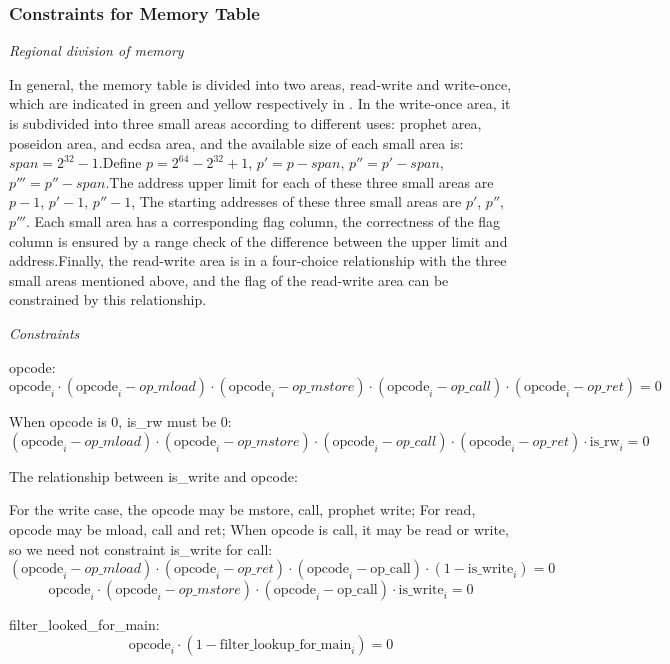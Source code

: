 \subsubsection{Constraints for Memory Table} \label{sec:memory-constraints}

\noindent \emph{Regional division of memory}

In general, the memory table is divided into two areas, read-write and write-once, which are indicated in green and yellow respectively in .
In the write-once area, it is subdivided into three small areas according to different uses: prophet area, poseidon area, and ecdsa area, and the available size of each small area is:
$span = 2^{32} - 1$.Define $p =2^{64} - 2^{32} + 1$, $p'=p-span$, $p''=p'-span$, $p'''=p''-span$.The address upper limit for each of these three small areas are $p-1$, $p'-1$, $p''-1$,
The starting addresses of these three small areas are $p'$, $p''$, $p'''$.
Each small area has a corresponding flag column, the correctness of the flag column is ensured by a
range check of the difference between the upper limit and address.Finally, the read-write area is in a four-choice relationship with the three small areas mentioned above, and the
flag of the read-write area can be constrained by this relationship.

\noindent \emph{Constraints}

opcode:
\[\mathrm{opcode}_i \cdot (\mathrm{opcode}_i - op\_mload) \cdot (\mathrm{opcode}_i-op\_mstore) \cdot (\mathrm{opcode}_i-op\_call) \cdot (\mathrm{opcode}_i-op\_ret)=0 \]

When opcode is 0, is\_rw must be 0:
\[ (\mathrm{opcode}_i-op\_mload) \cdot (\mathrm{opcode}_i-op\_mstore) \cdot (\mathrm{opcode}_i-op\_call) \cdot (\mathrm{opcode}_i-op\_ret) \cdot \mathrm{is\_rw}_i=0 \]

The relationship between is\_write and opcode:

For the write case, the opcode may be mstore, call, prophet write; For read, opcode may be mload, call and ret; When opcode is call, it may be read or write, so we need not constraint is\_write for call:
\[ (\mathrm{opcode}_i-op\_mload) \cdot (\mathrm{opcode}_i - op\_ret) \cdot (\mathrm{opcode}_i - \mathrm{op\_call}) \cdot (1-\mathrm{is\_write}_i) = 0 \]
\[ \mathrm{opcode}_i \cdot (\mathrm{opcode}_i - op\_mstore) \cdot (\mathrm{opcode}_i - \mathrm{op\_call}) \cdot \mathrm{is\_write}_i=0 \]

filter\_looked\_for\_main:
\[ \mathrm{opcode}_i \cdot (1-\mathrm{filter\_lookup\_for\_main}_i)=0 \]

